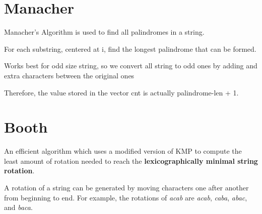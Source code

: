 \section{Manacher}

    Manacher's Algorithm is used to find all palindromes in a string.

    For each substring, centered at i, find the longest palindrome that can be formed.
    
    Works best for odd size string, so we convert all string to odd ones
    by adding and extra characters between the original ones

    Therefore, the value stored in the vector cnt is actually palindrome-len + 1.


\section{Booth}

    An efficient algorithm which uses a modified version of KMP to compute the
    least amount of rotation needed to reach the \textbf{lexicographically minimal string rotation}.

    A rotation of a string can be generated by moving characters one after another from beginning to end.
    For example, the rotations of \textit{acab} are \textit{acab}, \textit{caba}, \textit{abac}, and \textit{baca}.

